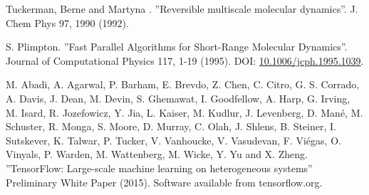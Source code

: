 \documentclass[twoside,english]{uiofysmaster}
\begin{document}
\begin{thebibliography}{56}
 Tuckerman, Berne and Martyna .
 ''Reversible multiscale molecular dynamics''.
 J. Chem Phys 97, 1990 (1992).
 
 S. Plimpton. 
 ''Fast Parallel Algorithms for Short-Range Molecular Dynamics''.
 Journal of Computational Physics 117, 1-19 (1995). 
 DOI: \href{https://doi.org/10.1006/jcph.1995.1039}{10.1006/jcph.1995.1039}. 
 
 M. Abadi, A. Agarwal, P. Barham, E. Brevdo,
 Z. Chen, C. Citro, G. S. Corrado, A. Davis,
 J. Dean, M. Devin, S. Ghemawat, I. Goodfellow,
 A. Harp, G. Irving, M. Isard, R. Jozefowicz, Y. Jia,
 L. Kaiser, M. Kudlur, J. Levenberg, D. Mané, M. Schuster,
 R. Monga, S. Moore, D. Murray, C. Olah, J. Shlens,
 B. Steiner, I. Sutskever, K. Talwar, P. Tucker,
 V. Vanhoucke, V. Vasudevan, F. Viégas,
 O. Vinyals, P. Warden, M. Wattenberg, M. Wicke,
 Y. Yu and X. Zheng.
 ''TensorFlow: Large-scale machine learning on heterogeneous systems''
 Preliminary White Paper (2015). 
 Software available from tensorflow.org.
 
\end{thebibliography}
\end{document}
